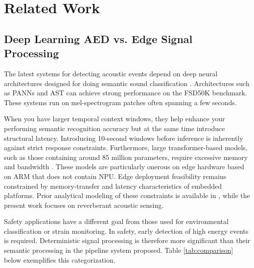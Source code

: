 \documentclass[conference]{IEEEtran}
\begin{document}
\section{Related Work}

\subsection{Deep Learning AED vs. Edge Signal Processing}

The latest systems for detecting acoustic events depend on deep neural architectures designed for doing semantic sound classification \cite{b8, b12}. Architectures such as PANNs \cite{b22} and AST \cite{b23} can achieve strong performance on the FSD50K benchmark. These systems run on mel-spectrogram patches often spanning a few seconds.

When you have larger temporal context windows, they help enhance your performing semantic recognition accuracy but at the same time introduce structural latency. Introducing 10-second windows before inference is inherently against strict response constraints. Furthermore, large transformer-based models, such as those containing around 85 million parameters, require excessive memory and bandwidth \cite{b15, b16}. These models are particularly onerous on edge hardware based on ARM that does not contain NPU. Edge deployment feasibility remains constrained by memory-transfer and latency characteristics of embedded platforms. Prior analytical modeling of these constraints is available in \cite{b34}, while the present work focuses on reverberant acoustic sensing.

Safety applications have a different goal from those used for environmental classification or strain monitoring. In safety, early detection of high energy events is required. Deterministic signal processing is therefore more significant than their semantic processing in the pipeline system proposed. Table \ref{tab:comparison} below exemplifies this categorization.

\begin{table}[htbp]
\caption{Applicability Analysis: Benchmark AED vs. Proposed System}
\begin{center}
\end{center}
\label{tab:comparison}
\end{table}
\end{document}
